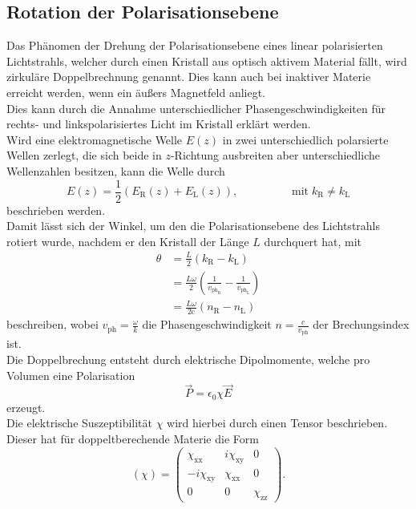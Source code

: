 \subsection{Rotation der Polarisationsebene}
  Das Phänomen der Drehung der Polarisationsebene eines linear
  polarisierten Lichtstrahls, welcher durch einen Kristall aus optisch aktivem Material fällt, wird zirkuläre Doppelbrechnung genannt.
  Dies kann auch bei inaktiver Materie erreicht werden, wenn ein äußers Magnetfeld anliegt.\\
  Dies kann durch die Annahme unterschiedlicher Phasengeschwindigkeiten für rechts- und
   linkspolarisiertes Licht im Kristall erklärt werden.\\
  Wird eine elektromagnetische Welle $E(z)$ in zwei unterschiedlich polarsierte Wellen zerlegt, die sich beide in $z$-Richtung
  ausbreiten aber unterschiedliche Wellenzahlen besitzen, kann die Welle durch
  \begin{equation}
    E(z)=\frac{1}{2}\left(E_{\text{R}}(z)+E_\text{{L}}(z)\right), \hspace{2cm}\text{mit}\; k_{\text{R}} \neq  k_{\text{L}}
    \label{eq:Wellezerlegt}
  \end{equation}
  beschrieben werden.\\
  Damit lässt sich der Winkel, um den die Polarisationsebene des Lichtstrahls rotiert wurde,
  nachdem er den Kristall der Länge $L$ durchquert hat, mit
  \begin{align}
    \theta &=\frac{L}{2} \left(k_{\text{R}}-k_{\text{L}}\right)\\
          &=\frac{L\omega}{2}\left(\frac{1}{v_{\text{ph}_{\text{R}}}}-\frac{1}{v_{\text{ph}_{\text{L}}}}\right)\\
          &=\frac{L\omega}{2\text{c}}\left(n_{\text{R}}-n_{\text{L}}\right)
  \end{align}
  beschreiben, wobei $v_{\text{ph}}=\frac{\omega}{k}$ die Phasengeschwindigkeit $n=\frac{c}{v_{\text{ph}}}$ der Brechungsindex ist.\\
  Die Doppelbrechung entsteht durch elektrische Dipolmomente, welche pro Volumen eine Polarisation
  \begin{equation}
    \vec{P}=\epsilon_0 \chi \vec{E}
  \end{equation}
  erzeugt.\\
  Die elektrische Suszeptibilität $\chi$ wird hierbei durch einen Tensor beschrieben.
  Dieser hat für doppeltberechende Materie die Form
  \begin{equation}
    \left( \chi \right)=
    \begin{pmatrix}
      \chi_{\text{xx}} & i\chi_{\text{xy}} & 0 \\
      -i \chi_{\text{xy}}& \chi_{\text{xx}} & 0 \\
      0& 0 & \chi_{\text{zz}}
      \end{pmatrix} .
    \end{equation}
